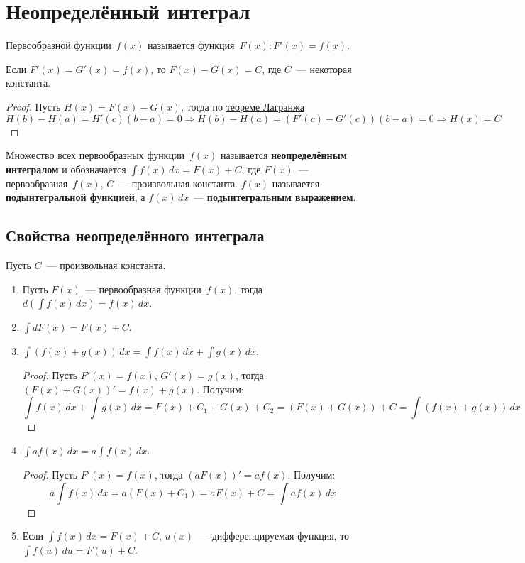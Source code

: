 \section{Неопределённый интеграл}
 Первообразной функции~$f(x)$ называется функция~$F(x) \colon F'(x) = f(x)$.

\begin{theorem}
Если $F'(x) = G'(x) = f(x)$, то $F(x) - G(x) = C$, где $C$~--- некоторая константа.
\end{theorem}
\begin{proof}
Пусть $H(x) = F(x) - G(x)$, тогда по \hyperref[th:mean_value]{теореме Лагранжа}
\begin{equation*}
H(b) - H(a) = H'(c)(b - a) = 0 \Rightarrow
H(b) - H(a) = (F'(c) - G'(c))(b - a) = 0 \Rightarrow
H(x) = C
\end{equation*}
\end{proof}

 Множество всех первообразных функции~$f(x)$ называется \textbf{неопределённым интегралом} и обозначается $\int f(x)\,dx = F(x) + C$, где $F(x)$~--- первообразная~$f(x)$, $C$~--- произвольная константа.
$f(x)$ называется \textbf{подынтегральной функцией}, а $f(x)\,dx$~--- \textbf{подынтегральным выражением}.

\subsection{Свойства неопределённого интеграла}
Пусть $C$~--- произвольная константа.
\begin{enumerate}
	\item Пусть $F(x)$~--- первообразная функции~$f(x)$, тогда $d \left( \int f(x)\,dx \right) = f(x)\,dx$.
	
	\item $\int dF(x) = F(x) + C$.
	
	\item $\int (f(x) + g(x))\,dx = \int f(x)\,dx + \int g(x)\,dx$.
	\begin{proof}
	Пусть $F'(x) = f(x)$, $G'(x) = g(x)$, тогда $(F(x) + G(x))' = f(x) + g(x)$.
	Получим:
	\begin{equation*}
	\int f(x)\,dx + \int g(x)\,dx = F(x) + C_1 + G(x) + C_2 = (F(x) + G(x)) + C = \int (f(x) + g(x))\,dx
	\end{equation*}
	\end{proof}
	
	\item $\int a f(x)\,dx = a \int f(x)\,dx$.
	\begin{proof}
	Пусть $F'(x) = f(x)$, тогда $(a F(x))' = a f(x)$.
	Получим:
	\begin{equation*}
	a \int f(x)\,dx = a(F(x) + C_1) = a F(x) + C = \int a f(x)\,dx
	\end{equation*}
	\end{proof}
	
	\item Если $\int f(x)\,dx = F(x) + C$, $u(x)$~--- дифференцируемая функция, то $\int f(u)\,du = F(u) + C$.
\end{enumerate}

